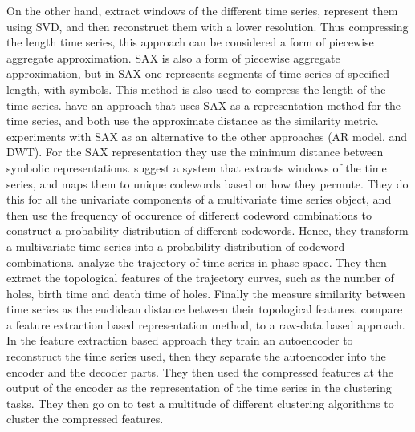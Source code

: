 On the other hand, \textcite{svd_birch_tsc_stock_price} extract windows of the different time series, represent them using SVD, and then reconstruct them with a lower resolution.
Thus compressing the length time series, this approach can be considered a form of piecewise aggregate approximation. 
SAX is also a form of piecewise aggregate approximation, but in SAX one represents segments of time series of specified length, with symbols.
This method is also used to compress the length of the time series. 
\textcite{clust_large_datasets_aghabozorg, apxdist_sax_k_modes} have an approach that uses SAX as a representation method for the time series, and both use the approximate distance as the similarity metric.
\textcite{shape_feat_mod_tsc_rfa} experiments with SAX as an alternative to the other approaches (AR model, and DWT). For the SAX representation they use the minimum distance between symbolic representations.
\textcite{dependency_tsc_energy_markets} suggest a system that extracts windows of the time series, and maps them to unique codewords based on how they permute.
They do this for all the univariate components of a multivariate time series object, 
and then use the frequency of occurence of different codeword combinations to construct a probability distribution of different codewords. 
Hence, they transform a multivariate time series into a probability distribution of codeword combinations. 
\textcite{topology_for_shape_based_tsc} analyze the trajectory of time series in phase-space. 
They then extract the topological features of the trajectory curves, such as the number of holes, birth time and death time of holes. 
Finally the measure similarity between time series as the euclidean distance between their topological features.
\textcite{auto_encoder_many_tsc_algorithms} compare a feature extraction based representation method, to a raw-data based approach. 
In the feature extraction based approach they train an autoencoder to reconstruct the time series used, then they separate the autoencoder into the encoder and the decoder parts. 
They then used the compressed features at the output of the encoder as the representation of the time series in the clustering tasks. 
They then go on to test a multitude of different clustering algorithms to cluster the compressed features. \bigskip

